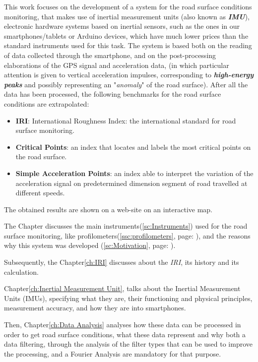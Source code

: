 \documentclass[tesi]{subfiles}
\begin{document}
This work focuses on the development of a system for the road surface conditions monitoring, that makes use of inertial measurement units (also known as \textbf{\textit{IMU}}), electronic hardware systems based on inertial sensors, such as the ones in our smartphones/tablets or Arduino devices, which have much lower prices than the standard instruments used for this task.
The system is based both on the reading of data collected through the smartphone, and on the post-processing elaborations of the GPS signal and acceleration data, (in which particular attention is given to vertical acceleration impulses, corresponding to \textbf{\textit{high-energy peaks}} and possibly representing an "\textit{anomaly}" of the road surface).
After all the data has been processed, the following benchmarks for the road surface conditions are extrapolated:
\begin{itemize}\label{it:indexes}
\item \textbf{IRI}: International Roughness Index: the international standard for road surface monitoring.
\item \textbf{Critical Points}: an index that locates and labels the most critical points on the road surface.
\item \textbf{Simple Acceleration Points}: an index able to interpret the variation of the acceleration signal on predetermined dimension segment of road travelled at different speeds.
\end{itemize}

The obtained results are shown on a web-site on an interactive map.

The  Chapter discusses the main instruments{\footnotesize (\ref{sc:Instruments})} used for the road surface monitoring, like profilometers{\footnotesize (\ref{ssc:profilometers}, page: \pageref{ssc:profilometers})}, and the reasons why this system was developed  {\footnotesize (\ref{sc:Motivation}, page: \pageref{sc:Motivation})}.


Subsequently, the Chapter\ref{ch:IRI} discusses about the \textit{IRI}, its history and its calculation.


Chapter\ref{ch:Inertial Measurement Unit}, talks about the Inertial Measurement Units (IMUs), specifying what they are, their functioning and physical principles, measurement accuracy, and how they are into smartphones.


Then, Chapter\ref{ch:Data Analysis} analyses  how these data can be processed in order to get road surface conditions, what these data represent and why both a data filtering, through the analysis of the filter types that can be used to improve the processing, and a Fourier Analysis are mandatory for that purpose.
\end{document}

